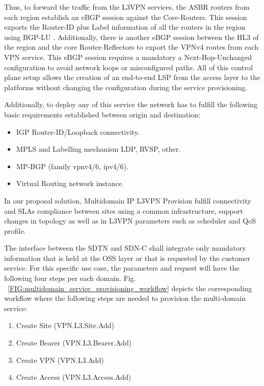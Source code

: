 \documentclass[a4paper,fleqn]{cas-dc}
\begin{document}
Thus, to forward the traffic from the L3VPN services, the ASBR routers from each region establish an eBGP session against the Core-Routers. This session exports the Router-ID plus Label information of all the routers in the region using BGP-LU \cite{rfc8277}. Additionally, there is another eBGP session between the HL3 of the region and the core Router-Reflectors to export the VPNv4 routes from each VPN service. This eBGP session requires a mandatory a Next-Hop-Unchanged configuration to avoid network loops or misconfigured paths. All of this control plane setup allows the creation of an end-to-end LSP from the access layer to the platforms without changing the configuration during the service provisioning.

Additionally, to deploy any of this service the network has to fulfill the following basic requirements established between origin and destination:
\begin{itemize}
    \item IGP Router-ID/Loopback connectivity.
    \item MPLS and Labelling mechanism LDP, RVSP, other. 
    \item MP-BGP (family vpnv4/6, ipv4/6).
    \item Virtual Routing network instance. 
\end{itemize}

In our proposal solution, Multidomain IP L3VPN Provision fulfill connectivity and SLAs compliance between sites using a common infrastructure, support changes in topology as well as in L3VPN parameters such as scheduler and QoS profile. 

The interface between the SDTN and SDN-C shall integrate only mandatory information that is held at the OSS layer or that is requested by the customer service. For this specific use case, the parameters and request will have the following four steps per each domain. Fig.  ~\ref{FIG:multidomain_service_provisioning_workflow} depicts the corresponding workflow where the following steps are needed to provision the multi-domain service:
\begin{enumerate}
    \item Create Site (VPN.L3.Site.Add)
    \item Create Bearer (VPN.L3.Bearer.Add)
    \item Create VPN (VPN.L3.Add)
    \item Create Access (VPN.L3.Access.Add)
\end{enumerate}
\end{document}

